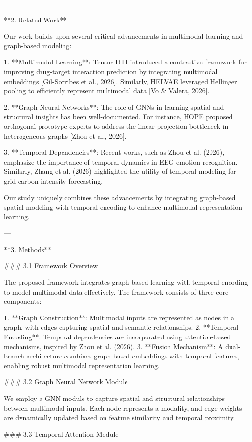 ---

**2. Related Work**

Our work builds upon several critical advancements in multimodal learning and graph-based modeling:

1. **Multimodal Learning**: Tensor-DTI introduced a contrastive framework for improving drug-target interaction prediction by integrating multimodal embeddings [Gil-Sorribes et al., 2026]. Similarly, HELVAE leveraged Hellinger pooling to efficiently represent multimodal data [Vo & Valera, 2026].

2. **Graph Neural Networks**: The role of GNNs in learning spatial and structural insights has been well-documented. For instance, HOPE proposed orthogonal prototype experts to address the linear projection bottleneck in heterogeneous graphs [Zhou et al., 2026].

3. **Temporal Dependencies**: Recent works, such as Zhou et al. (2026), emphasize the importance of temporal dynamics in EEG emotion recognition. Similarly, Zhang et al. (2026) highlighted the utility of temporal modeling for grid carbon intensity forecasting.

Our study uniquely combines these advancements by integrating graph-based spatial modeling with temporal encoding to enhance multimodal representation learning.

---

**3. Methods**

### 3.1 Framework Overview

The proposed framework integrates graph-based learning with temporal encoding to model multimodal data effectively. The framework consists of three core components:

1. **Graph Construction**: Multimodal inputs are represented as nodes in a graph, with edges capturing spatial and semantic relationships.
2. **Temporal Encoding**: Temporal dependencies are incorporated using attention-based mechanisms, inspired by Zhou et al. (2026).
3. **Fusion Mechanism**: A dual-branch architecture combines graph-based embeddings with temporal features, enabling robust multimodal representation learning.

### 3.2 Graph Neural Network Module

We employ a GNN module to capture spatial and structural relationships between multimodal inputs. Each node represents a modality, and edge weights are dynamically updated based on feature similarity and temporal proximity.

### 3.3 Temporal Attention Module

